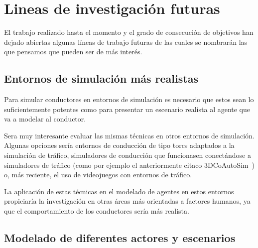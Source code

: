\chapter{Lineas de investigación futuras}
\label{ch:future-work}

El trabajo realizado hasta el momento y el grado de consecución de objetivos han dejado abiertas algunas líneas de trabajo futuras de las cuales se nombrarán las que pensamos que pueden ser de más interés.

\section{Entornos de simulación más realistas}

Para simular conductores en entornos de simulación es necesario que estos sean lo suficientemente potentes como para presentar un escenario realista al agente que va a modelar al conductor.

Sera muy interesante evaluar las mismas técnicas en otros entornos de simulación. Algunas opciones sería entornos de conducción de tipo \ac{torcs} adaptados a la simulación de tráfico, simuladores de conducción que funcionasen conectándose a simuladores de tráfico (como por ejemplo el anteriormente citaco 3DCoAutoSim~\cite{olaverri2018implementation}) o, más reciente, el uso de videojuegos con entornos de tráfico.

La aplicación de estas técnicas en el modelado de agentes en estos entornos propiciaría la investigación en otras áreas más orientadas a factores humanos, ya que el comportamiento de los conductores sería más realista.

\section{Modelado de diferentes actores y escenarios}

